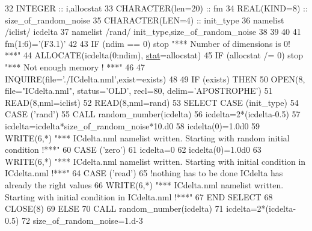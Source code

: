 \begin{DoxyCode}
32     \textcolor{keywordtype}{INTEGER} :: i,allocstat
33     \textcolor{keywordtype}{CHARACTER(len=20)} :: fm
34     \textcolor{keywordtype}{REAL(KIND=8)} :: size\_of\_random\_noise
35     \textcolor{keywordtype}{CHARACTER(LEN=4)} :: init\_type 
36     namelist /iclist/ icdelta
37     namelist /rand/ init\_type,size\_of\_random\_noise 
38 
39 
40 
41     fm(1:6)=\textcolor{stringliteral}{'(F3.1)'}
42    
43     \textcolor{keywordflow}{IF} (ndim == 0) stop \textcolor{stringliteral}{"*** Number of dimensions is 0! ***"}
44     \textcolor{keyword}{ALLOCATE}(icdelta(0:ndim), \hyperlink{namespacestat}{stat}=allocstat)
45     \textcolor{keywordflow}{IF} (allocstat /= 0) stop \textcolor{stringliteral}{"*** Not enough memory ! ***"}
46 
47     \textcolor{keyword}{INQUIRE}(file=\textcolor{stringliteral}{'./ICdelta.nml'},exist=exists)
48 
49     \textcolor{keywordflow}{IF} (exists) \textcolor{keywordflow}{THEN}
50        \textcolor{keyword}{OPEN}(8, file=\textcolor{stringliteral}{"ICdelta.nml"}, status=\textcolor{stringliteral}{'OLD'}, recl=80, delim=\textcolor{stringliteral}{'APOSTROPHE'})
51        \textcolor{keyword}{READ}(8,nml=iclist)
52        \textcolor{keyword}{READ}(8,nml=rand)
53        \textcolor{keywordflow}{SELECT CASE} (init\_type)
54          \textcolor{keywordflow}{CASE} (\textcolor{stringliteral}{'rand'})
55            \textcolor{keyword}{CALL }random\_number(icdelta)
56            icdelta=2*(icdelta-0.5)
57            icdelta=icdelta*size\_of\_random\_noise*10.d0
58            icdelta(0)=1.0d0
59            \textcolor{keyword}{WRITE}(6,*) \textcolor{stringliteral}{"*** ICdelta.nml namelist written. Starting with random initial condition !***"}
60          \textcolor{keywordflow}{CASE} (\textcolor{stringliteral}{'zero'})
61            icdelta=0
62            icdelta(0)=1.0d0
63            \textcolor{keyword}{WRITE}(6,*) \textcolor{stringliteral}{"*** ICdelta.nml namelist written. Starting with initial condition in ICdelta.nml
       !***"}
64          \textcolor{keywordflow}{CASE} (\textcolor{stringliteral}{'read'})
65            \textcolor{comment}{!nothing has to be done ICdelta has already the right values}
66            \textcolor{keyword}{WRITE}(6,*) \textcolor{stringliteral}{"*** ICdelta.nml namelist written. Starting with initial condition in ICdelta.nml
       !***"}
67 \textcolor{keywordflow}{       END SELECT}
68        \textcolor{keyword}{CLOSE}(8)
69     \textcolor{keywordflow}{ELSE}
70        \textcolor{keyword}{CALL }random\_number(icdelta)
71        icdelta=2*(icdelta-0.5)
72        size\_of\_random\_noise=1.d-3

\end{DoxyCode}
